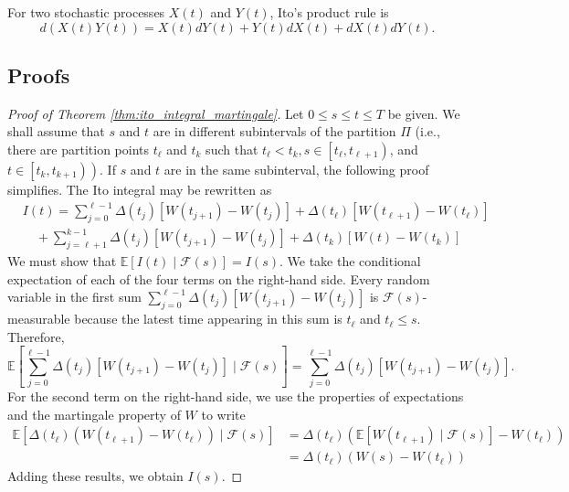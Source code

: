 \documentclass[\topdir/lecture\_notes.tex]{subfiles}
\begin{document}
For two stochastic processes \(X(t)\) and \(Y(t)\), Ito's product rule is
\begin{equation*}
d(X(t) Y(t))=X(t) d Y(t)+Y(t) d X(t)+d X(t) d Y(t).
\end{equation*}
\begin{optional}
\subsection{Proofs}\label{subsec:ito_proofs}

\begin{proof}[Proof of Theorem \ref{thm:ito_integral_martingale}]
Let \(0 \leq s \leq t \leq T\) be given. We shall assume that \(s\) and \(t\) are in different subintervals of the partition \(\Pi\) (i.e., there are partition points \(t_{\ell}\) and \(t_{k}\) such that \(t_{\ell}<t_{k}, s \in\left[t_{\ell}, t_{\ell+1}\right)\), and \(\left.t \in\left[t_{k}, t_{k+1}\right)\right)\). If \(s\) and \(t\) are in the same subinterval, the following proof simplifies. The Ito integral may be rewritten as
\begin{align}
& I(t)=\sum_{j=0}^{\ell-1} \Delta\left(t_{j}\right)\left[W\left(t_{j+1}\right)-W\left(t_{j}\right)\right]+\Delta\left(t_{\ell}\right)\left[W\left(t_{\ell+1}\right)-W\left(t_{\ell}\right)\right] \\
& \quad+\sum_{j=\ell+1}^{k-1} \Delta\left(t_{j}\right)\left[W\left(t_{j+1}\right)-W\left(t_{j}\right)\right]+\Delta\left(t_{k}\right)\left[W(t)-W\left(t_{k}\right)\right]
\label{4.2.3}
\end{align}
We must show that \(\mathbb{E}[I(t) \mid \mathcal{F}(s)]=I(s)\). We take the conditional expectation of each of the four terms on the right-hand side. Every random variable in the first sum \(\sum_{j=0}^{\ell-1} \Delta\left(t_{j}\right)\left[W\left(t_{j+1}\right)-W\left(t_{j}\right)\right]\) is \(\mathcal{F}(s)\)-measurable because the latest time appearing in this sum is \(t_{\ell}\) and \(t_{\ell} \leq s\). Therefore,
\begin{equation}
\mathbb{E}\left[\sum_{j=0}^{\ell-1} \Delta\left(t_{j}\right)\left[W\left(t_{j+1}\right)-W\left(t_{j}\right)\right] \mid \mathcal{F}(s)\right]=\sum_{j=0}^{\ell-1} \Delta\left(t_{j}\right)\left[W\left(t_{j+1}\right)-W\left(t_{j}\right)\right]. \label{4.2.4}
\end{equation}
For the second term on the right-hand side, we use the properties of expectations and the martingale property of \(W\) to write
\begin{align}
\mathbb{E}\left[\Delta\left(t_{\ell}\right)\left(W\left(t_{\ell+1}\right)-W\left(t_{\ell}\right)\right) \mid \mathcal{F}(s)\right] & =\Delta\left(t_{\ell}\right)\left(\mathbb{E}\left[W\left(t_{\ell+1}\right) \mid \mathcal{F}(s)\right]-W\left(t_{\ell}\right)\right) \\
& =\Delta\left(t_{\ell}\right)\left(W(s)-W\left(t_{\ell}\right)\right)
\label{4.2.5}
\end{align}
Adding these results, we obtain \(I(s)\).


\end{proof}
\end{optional}
\end{document}

